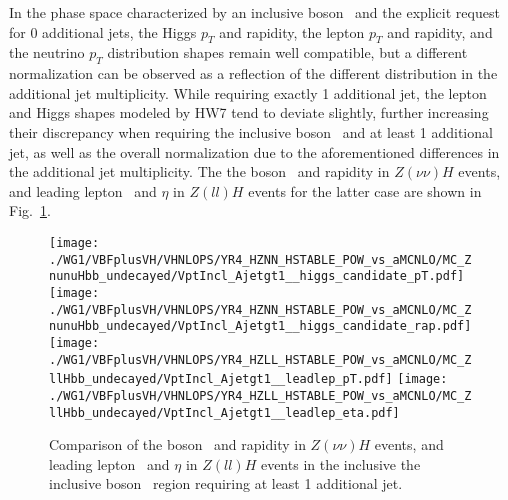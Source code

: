 
In the phase space characterized by an inclusive boson \pt\ and the explicit request for 0 additional jets,
the Higgs $p_T$ and rapidity, the lepton $p_T$ and rapidity, and the neutrino $p_T$
distribution shapes remain well compatible, but a different normalization can be observed as a reflection of the
different distribution in the additional jet multiplicity.
While requiring exactly 1 additional jet,
the lepton and Higgs \pt shapes modeled by HW7 tend to deviate slightly,
further increasing their discrepancy 
when requiring the inclusive boson \pt\ and at least 1 additional jet,
as well as the overall normalization due to the aforementioned differences in the additional jet multiplicity.
The the boson \pt\ and rapidity in $Z(\nu\nu)H$ events, and leading lepton \pt\ and $\eta$ in $Z(ll)H$ events 
for the latter case are shown in Fig.~\ref{fig:stable__gt1j_hig}.
\begin{figure}[hptb]
\centering
\texttt{[image: ./WG1/VBFplusVH/VHNLOPS/YR4\_HZNN\_HSTABLE\_POW\_vs\_aMCNLO/MC\_ZnunuHbb\_undecayed/VptIncl\_Ajetgt1\_\_higgs\_candidate\_pT.pdf]}
\texttt{[image: ./WG1/VBFplusVH/VHNLOPS/YR4\_HZNN\_HSTABLE\_POW\_vs\_aMCNLO/MC\_ZnunuHbb\_undecayed/VptIncl\_Ajetgt1\_\_higgs\_candidate\_rap.pdf]}
\texttt{[image: ./WG1/VBFplusVH/VHNLOPS/YR4\_HZLL\_HSTABLE\_POW\_vs\_aMCNLO/MC\_ZllHbb\_undecayed/VptIncl\_Ajetgt1\_\_leadlep\_pT.pdf]}
\texttt{[image: ./WG1/VBFplusVH/VHNLOPS/YR4\_HZLL\_HSTABLE\_POW\_vs\_aMCNLO/MC\_ZllHbb\_undecayed/VptIncl\_Ajetgt1\_\_leadlep\_eta.pdf]}
\caption{Comparison of the boson \pt\ and rapidity in $Z(\nu\nu)H$ events, and leading lepton \pt\ and $\eta$ in $Z(ll)H$ events in the inclusive 
the inclusive boson \pt\ region requiring at least 1 additional jet.}
\label{fig:stable__gt1j_hig}
\end{figure}

